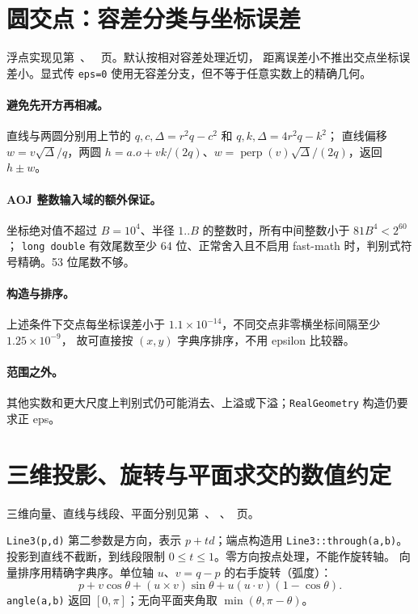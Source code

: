 \section{圆交点：容差分类与坐标误差}
\label{geometry-circle-zero}
浮点实现见第~\pageref{compact-line_circle_intersections}、
\pageref{compact-circle_intersections}~页。默认按相对容差处理近切，
距离误差小不推出交点坐标误差小。显式传 \texttt{eps=0} 使用无容差分支，但不等于任意实数上的精确几何。

\paragraph{避免先开方再相减。}
直线与两圆分别用上节的 $q,c,\Delta=r^2q-c^2$ 和 $q,k,\Delta=4r^2q-k^2$；
直线偏移 $w=v\sqrt\Delta/q$，两圆 $h=a.o+vk/(2q)$、$w=\operatorname{perp}(v)\sqrt\Delta/(2q)$，返回 $h\pm w$。

\paragraph{AOJ 整数输入域的额外保证。}
坐标绝对值不超过 $B=10^4$、半径 $1..B$ 的整数时，所有中间整数小于 $81B^4<2^{60}$；
\texttt{long double} 有效尾数至少 64 位、正常舍入且不启用 fast-math 时，判别式符号精确。53 位尾数不够。

\paragraph{构造与排序。}
上述条件下交点每坐标误差小于 $1.1\times10^{-14}$，不同交点非零横坐标间隔至少 $1.25\times10^{-9}$，
故可直接按 $(x,y)$ 字典序排序，不用 epsilon 比较器。

\paragraph{范围之外。}
其他实数和更大尺度上判别式仍可能消去、上溢或下溢；\texttt{RealGeometry} 构造仍要求正 eps。

\section{三维投影、旋转与平面求交的数值约定}
三维向量、直线与线段、平面分别见第~\pageref{compact-RealSpace}、
\pageref{compact-Line3}、\pageref{compact-Plane3}~页。

\texttt{Line3(p,d)} 第二参数是方向，表示 $p+td$；端点构造用 \texttt{Line3::through(a,b)}。
投影到直线不截断，到线段限制 $0\le t\le1$。零方向按点处理，不能作旋转轴。
向量排序用精确字典序。单位轴 $u$、$v=q-p$ 的右手旋转（弧度）：
\[
p+v\cos\theta+(u\times v)\sin\theta+u(u\cdot v)(1-\cos\theta).
\]
\texttt{angle(a,b)} 返回 $[0,\pi]$；无向平面夹角取 $\min(\theta,\pi-\theta)$。

